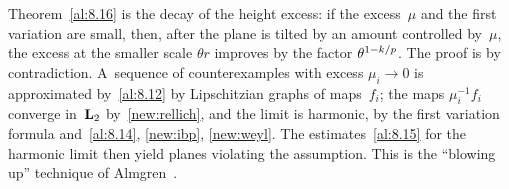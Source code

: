 \begin{miniremark}
    \label{mr:8.16}
    Theorem~\ref{al:8.16} is the decay of the height excess: if the excess~$\mu$ and the first
    variation are small, then, after the plane is tilted by an amount controlled by~$\mu$, the
    excess at the smaller scale $\theta r$ improves by the factor $\theta^{1-k/p}$. The proof is
    by contradiction. A~sequence of counterexamples with excess $\mu_i \to 0$ is approximated
    by~\ref{al:8.12} by Lipschitzian graphs of maps~$f_i$; the maps $\mu_i^{-1} f_i$ converge
    in~$\mathbf{L}_{2}$ by~\ref{new:rellich}, and the limit is harmonic, by the first variation formula
    and~\ref{al:8.14}, \ref{new:ibp}, \ref{new:weyl}. The estimates~\ref{al:8.15} for the harmonic
    limit then yield planes violating the assumption. This is the ``blowing up'' technique of
    Almgren~\cite[6.2, 6.4]{Almgren1968}.
\end{miniremark}


